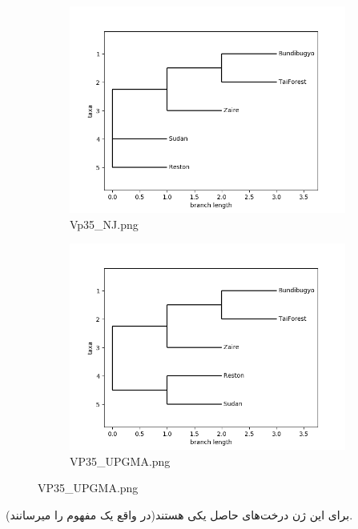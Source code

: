 \documentclass[11pt]{article}
\begin{document}
\begin{figure}[H]
  \centering
  \begin{subfigure}[b]{0.4\linewidth}
    \includegraphics[width=\linewidth]{../Data/Trees/VP35_NJ.png}
    \caption{Vp35\_NJ.png}
  \end{subfigure}
  \begin{subfigure}[b]{0.4\linewidth}
    \includegraphics[width=\linewidth]{../Data/Trees/VP35_UPGMA.png}
    \caption{VP35\_UPGMA.png}
  \end{subfigure}
\end{figure}
برای این ژن درخت‌های حاصل یکی هستند(در واقع یک مفهوم را میرسانند).
\newline
\end{document}
